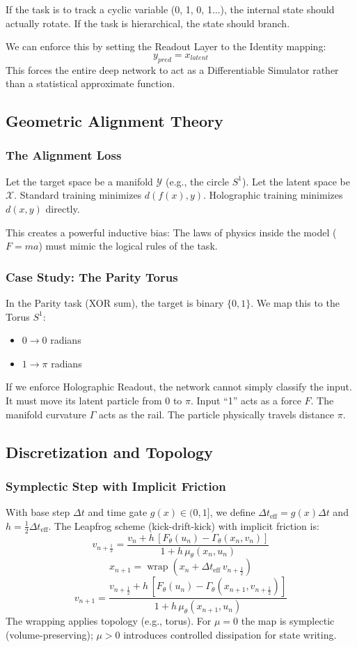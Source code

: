 \documentclass{article}
\numberwithin{equation}{section}
\begin{document}
If the task is to track a cyclic variable (0, 1, 0, 1...), the internal state should actually rotate. If the task is hierarchical, the state should branch.

We can enforce this by setting the Readout Layer to the Identity mapping:
\[
y_{pred} = x_{latent}
\]
This forces the entire deep network to act as a Differentiable Simulator rather than a statistical approximate function.

\subsection{Geometric Alignment Theory}
\subsubsection{The Alignment Loss}
Let the target space be a manifold $\mathcal{Y}$ (e.g., the circle $S^1$). Let the latent space be $\mathcal{X}$. Standard training minimizes $d(f(x), y)$. Holographic training minimizes $d(x, y)$ directly.

This creates a powerful inductive bias: The laws of physics inside the model ($F=ma$) must mimic the logical rules of the task.

\subsubsection{Case Study: The Parity Torus}
In the Parity task (XOR sum), the target is binary $\{0, 1\}$. We map this to the Torus $S^1$:
\begin{itemize}
\item $0 \to 0$ radians
\item $1 \to \pi$ radians
\end{itemize}
If we enforce Holographic Readout, the network cannot simply classify the input. It must move its latent particle from $0$ to $\pi$. Input ``1'' acts as a force $F$. The manifold curvature $\Gamma$ acts as the rail. The particle physically travels distance $\pi$.

\subsection{Discretization and Topology}
\subsubsection{Symplectic Step with Implicit Friction}
With base step $\Delta t$ and time gate $g(x)\in(0,1]$, we define $\Delta t_{\text{eff}}=g(x)\Delta t$ and $h=\tfrac{1}{2}\Delta t_{\text{eff}}$. The Leapfrog scheme (kick-drift-kick) with implicit friction is:
\[
v_{n+\frac{1}{2}} = \frac{v_n + h\,[F_\theta(u_n) - \Gamma_\theta(x_n, v_n)]}{1 + h\,\mu_\theta(x_n,u_n)}
\]
\[
x_{n+1} = \operatorname{wrap}\!\left(x_n + \Delta t_{\text{eff}}\, v_{n+\frac{1}{2}}\right)
\]
\[
v_{n+1} = \frac{v_{n+\frac{1}{2}} + h\,[F_\theta(u_n) - \Gamma_\theta(x_{n+1}, v_{n+\frac{1}{2}})]}{1 + h\,\mu_\theta(x_{n+1},u_n)}
\]
The wrapping applies topology (e.g., torus). For $\mu=0$ the map is symplectic (volume-preserving); $\mu>0$ introduces controlled dissipation for state writing.
\end{document}
